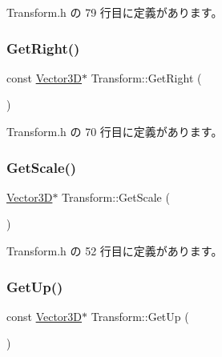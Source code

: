  Transform.\+h の 79 行目に定義があります。

\mbox{\label{class_transform_a57d1da919d8df7d2452149c4bbade4d2}} 
\subsubsection{\texorpdfstring{Get\+Right()}{GetRight()}}
{\footnotesize\ttfamily const \mbox{\hyperlink{class_vector3_d}{Vector3D}}$\ast$ Transform\+::\+Get\+Right (\begin{DoxyParamCaption}{ }\end{DoxyParamCaption})\hspace{0.3cm}{\ttfamily [inline]}}



 Transform.\+h の 70 行目に定義があります。

\mbox{\label{class_transform_accedf33a4ddbdcf2d4fc4274f85bf818}} 
\subsubsection{\texorpdfstring{Get\+Scale()}{GetScale()}}
{\footnotesize\ttfamily \mbox{\hyperlink{class_vector3_d}{Vector3D}}$\ast$ Transform\+::\+Get\+Scale (\begin{DoxyParamCaption}{ }\end{DoxyParamCaption})\hspace{0.3cm}{\ttfamily [inline]}}



 Transform.\+h の 52 行目に定義があります。

\mbox{\label{class_transform_a9f5700481ae42556f763726947feaf36}} 
\subsubsection{\texorpdfstring{Get\+Up()}{GetUp()}}
{\footnotesize\ttfamily const \mbox{\hyperlink{class_vector3_d}{Vector3D}}$\ast$ Transform\+::\+Get\+Up (\begin{DoxyParamCaption}{ }\end{DoxyParamCaption})\hspace{0.3cm}{\ttfamily [inline]}}



